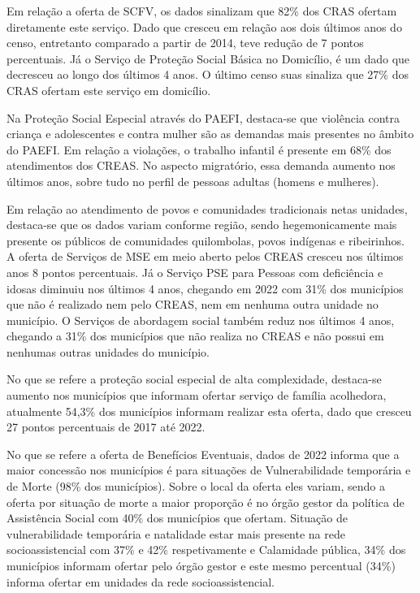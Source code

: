 \documentclass[
  brazilian]{report}
\begin{document}
Em relação a oferta de SCFV, os dados sinalizam que 82\% dos CRAS
ofertam diretamente este serviço. Dado que cresceu em relação aos dois
últimos anos do censo, entretanto comparado a partir de 2014, teve
redução de 7 pontos percentuais. Já o Serviço de Proteção Social Básica
no Domicílio, é um dado que decresceu ao longo dos últimos 4 anos. O
último censo suas sinaliza que 27\% dos CRAS ofertam este serviço em
domicílio.

Na Proteção Social Especial através do PAEFI, destaca-se que violência
contra criança e adolescentes e contra mulher são as demandas mais
presentes no âmbito do PAEFI. Em relação a violações, o trabalho
infantil é presente em 68\% dos atendimentos dos CREAS. No aspecto
migratório, essa demanda aumento nos últimos anos, sobre tudo no perfil
de pessoas adultas (homens e mulheres).

Em relação ao atendimento de povos e comunidades tradicionais netas
unidades, destaca-se que os dados variam conforme região, sendo
hegemonicamente mais presente os públicos de comunidades quilombolas,
povos indígenas e ribeirinhos. A oferta de Serviços de MSE em meio
aberto pelos CREAS cresceu nos últimos anos 8 pontos percentuais. Já o
Serviço PSE para Pessoas com deficiência e idosas diminuiu nos últimos 4
anos, chegando em 2022 com 31\% dos municípios que não é realizado nem
pelo CREAS, nem em nenhuma outra unidade no município. O Serviços de
abordagem social também reduz nos últimos 4 anos, chegando a 31\% dos
municípios que não realiza no CREAS e não possui em nenhumas outras
unidades do município.

No que se refere a proteção social especial de alta complexidade,
destaca-se aumento nos municípios que informam ofertar serviço de
família acolhedora, atualmente 54,3\% dos municípios informam realizar
esta oferta, dado que cresceu 27 pontos percentuais de 2017 até 2022.

No que se refere a oferta de Benefícios Eventuais, dados de 2022 informa
que a maior concessão nos municípios é para situações de Vulnerabilidade
temporária e de Morte (98\% dos municípios). Sobre o local da oferta
eles variam, sendo a oferta por situação de morte a maior proporção é no
órgão gestor da política de Assistência Social com 40\% dos municípios
que ofertam. Situação de vulnerabilidade temporária e natalidade estar
mais presente na rede socioassistencial com 37\% e 42\% respetivamente e
Calamidade pública, 34\% dos municípios informam ofertar pelo órgão
gestor e este mesmo percentual (34\%) informa ofertar em unidades da
rede socioassistencial.
\end{document}
